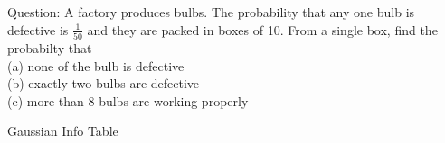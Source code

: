 \documentclass[journal,12pt,onecolumn]{IEEEtran}
\theoremstyle{remark}
\begin{document}
%
Question: A factory produces bulbs. The probability that any one bulb is defective is $\frac{1}{50}$ and they are packed in boxes of 10. From a single box, find the probabilty that\\
(a) none of the bulb is defective\\
(b) exactly two bulbs are defective\\
(c) more than 8 bulbs are working properly
\\ \solution
\begin{table}[!htb]
	
	\caption{Gaussian Info Table}
	\label{table:gaussian/9/3/25/}	
\end{table}
%
\end{document}
